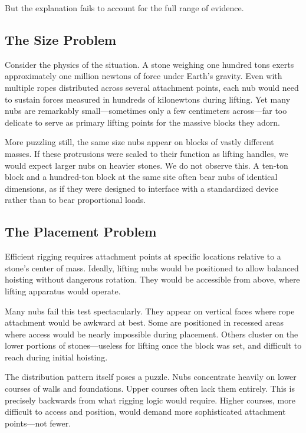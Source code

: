 \documentclass[11pt]{article}
\begin{document}
But the explanation fails to account for the full range of evidence.

\subsection{The Size Problem}

Consider the physics of the situation. A stone weighing one hundred tons exerts approximately one million newtons of force under Earth's gravity. Even with multiple ropes distributed across several attachment points, each nub would need to sustain forces measured in hundreds of kilonewtons during lifting. Yet many nubs are remarkably small—sometimes only a few centimeters across—far too delicate to serve as primary lifting points for the massive blocks they adorn.

More puzzling still, the same size nubs appear on blocks of vastly different masses. If these protrusions were scaled to their function as lifting handles, we would expect larger nubs on heavier stones. We do not observe this. A ten-ton block and a hundred-ton block at the same site often bear nubs of identical dimensions, as if they were designed to interface with a standardized device rather than to bear proportional loads.

\subsection{The Placement Problem}

Efficient rigging requires attachment points at specific locations relative to a stone's center of mass. Ideally, lifting nubs would be positioned to allow balanced hoisting without dangerous rotation. They would be accessible from above, where lifting apparatus would operate.

Many nubs fail this test spectacularly. They appear on vertical faces where rope attachment would be awkward at best. Some are positioned in recessed areas where access would be nearly impossible during placement. Others cluster on the lower portions of stones—useless for lifting once the block was set, and difficult to reach during initial hoisting.

The distribution pattern itself poses a puzzle. Nubs concentrate heavily on lower courses of walls and foundations. Upper courses often lack them entirely. This is precisely backwards from what rigging logic would require. Higher courses, more difficult to access and position, would demand more sophisticated attachment points—not fewer.
\end{document}
